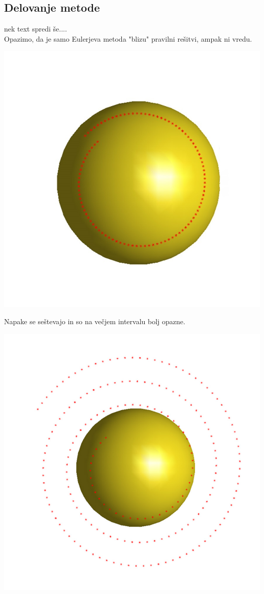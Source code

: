 \documentclass[]{article}
\begin{document}
\subsection{Delovanje metode}
	nek text spredi še....\\
	\newline
	Opazimo, da je samo Eulerjeva metoda "blizu" pravilni rešitvi, ampak ni vredu.
	\begin{center}
		\includegraphics[scale=0.30]{eul1}
	\end{center}
	Napake se seštevajo in so na večjem intervalu bolj opazne.\\
	\begin{center}
		\includegraphics[scale=0.30]{eul2}
	\end{center}
\end{document}
